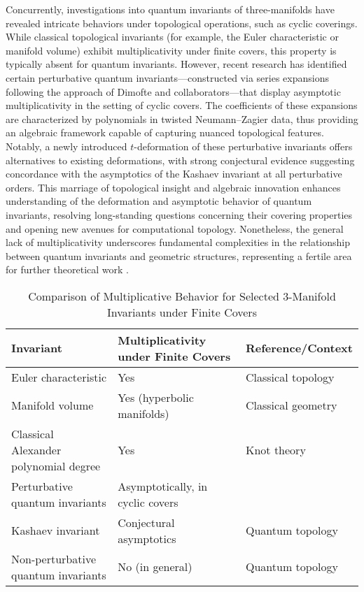 Concurrently, investigations into quantum invariants of three-manifolds have revealed intricate behaviors under topological operations, such as cyclic coverings. While classical topological invariants (for example, the Euler characteristic or manifold volume) exhibit multiplicativity under finite covers, this property is typically absent for quantum invariants. However, recent research has identified certain perturbative quantum invariants—constructed via series expansions following the approach of Dimofte and collaborators—that display asymptotic multiplicativity in the setting of cyclic covers. The coefficients of these expansions are characterized by polynomials in twisted Neumann–Zagier data, thus providing an algebraic framework capable of capturing nuanced topological features. Notably, a newly introduced $t$-deformation of these perturbative invariants offers alternatives to existing deformations, with strong conjectural evidence suggesting concordance with the asymptotics of the Kashaev invariant at all perturbative orders. This marriage of topological insight and algebraic innovation enhances understanding of the deformation and asymptotic behavior of quantum invariants, resolving long-standing questions concerning their covering properties and opening new avenues for computational topology. Nonetheless, the general lack of multiplicativity underscores fundamental complexities in the relationship between quantum invariants and geometric structures, representing a fertile area for further theoretical work \cite{ref89}.

\begin{table*}[htbp]
\centering
\caption{Comparison of Multiplicative Behavior for Selected 3-Manifold Invariants under Finite Covers}
\label{tab:covering_invariants}
\begin{adjustbox}{max width=\textwidth}
\begin{tabular}{lll}
\toprule
\textbf{Invariant} & \textbf{Multiplicativity under Finite Covers} & \textbf{Reference/Context} \\
\midrule
Euler characteristic & Yes & Classical topology \\
Manifold volume & Yes (hyperbolic manifolds) & Classical geometry \\
Classical Alexander polynomial degree & Yes & Knot theory \\
Perturbative quantum invariants & Asymptotically, in cyclic covers & \cite{ref89} \\
Kashaev invariant & Conjectural asymptotics & Quantum topology \\
Non-perturbative quantum invariants & No (in general) & Quantum topology \\
\bottomrule
\end{tabular}
\end{adjustbox}
\end{table*}

